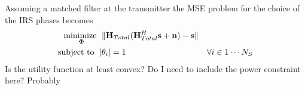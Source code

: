 \documentclass[12pt,a4paper]{report}
\begin{document}
Assuming a matched filter at the transmitter the MSE problem for the choice of the IRS phases becomes
		\begin{subequations}
	\label{optim}
	\begin{align}
	    \underset{\boldsymbol{\Phi}}{\text{minimize }}
	    & \; \| \mathbf{H}_{Total}(\mathbf{H}_{Total}^H\mathbf{s} + \mathbf{n}) - \mathbf{s} \| \label{potential_game} \\
	    \text{subject to  } \; &
	    | \theta_i | = 1 & \forall i \in {1 \cdots	 N_S}
		\label{pos_power_const}
	\end{align}
	\end{subequations}
	Is the utility function at least convex?
	Do I need to include the power constraint here? Probably

\end{document}
